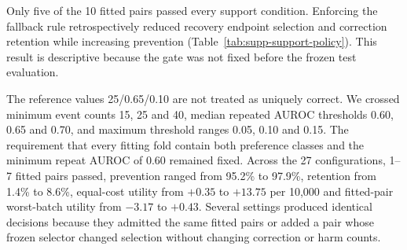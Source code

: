 \documentclass[10pt]{article}
\begin{document}
\begin{table}[ht]
\centering
\caption{Post hoc proposed deployment-support gate applied retrospectively to the 10 frozen endpoint pairs. Event counts use informative Batch~7 calibration rows. AUROC and threshold summaries use 10 repeated grouped cross-fitting splits. The gate is an intended prospective operational boundary, not a prespecified test or replacement estimand.}
\label{tab:supp-deployment-support}
\resizebox{\textwidth}{!}{}
\end{table}

Only five of the 10 fitted pairs passed every support condition. Enforcing the fallback rule retrospectively reduced recovery endpoint selection and correction retention while increasing prevention (Table~\ref{tab:supp-support-policy}). This result is descriptive because the gate was not fixed before the frozen test evaluation.

\begin{table}[ht]
\centering
\caption{Descriptive consequence of applying the post hoc support gate retrospectively to the frozen strict test set. Unsupported endpoint pairs emit PDRF on every observation; supported pairs retain their previously frozen Lite-CF selector.}
\label{tab:supp-support-policy}
\resizebox{0.88\textwidth}{!}{}
\end{table}

The reference values 25/0.65/0.10 are not treated as uniquely correct. We crossed minimum event counts 15, 25 and 40, median repeated AUROC thresholds 0.60, 0.65 and 0.70, and maximum threshold ranges 0.05, 0.10 and 0.15. The requirement that every fitting fold contain both preference classes and the minimum repeat AUROC of 0.60 remained fixed. Across the 27 configurations, 1--7 fitted pairs passed, prevention ranged from 95.2\% to 97.9\%, retention from 1.4\% to 8.6\%, equal-cost utility from $+0.35$ to $+13.75$ per 10,000 and fitted-pair worst-batch utility from $-3.17$ to $+0.43$. Several settings produced identical decisions because they admitted the same fitted pairs or added a pair whose frozen selector changed selection without changing correction or harm counts.

\begin{table}[H]
\centering
\caption{Complete $3\times3\times3$ sensitivity grid for the post hoc deployment-support gate. $U_1$ assigns equal value to a correction and a harm with no compute penalty. Worst-batch utility first takes the least favourable acquisition-batch mean within each fitted pair and then averages the 10 fitted-pair values. The bold count marks the conservative reference configuration.}
\label{tab:supp-gate-grid}
\scriptsize
\resizebox{0.90\textwidth}{!}{}
\end{table}
\end{document}
